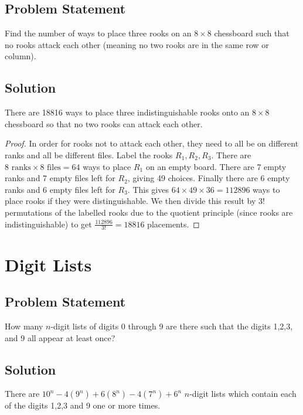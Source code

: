 \documentclass[12pt]{article}
\begin{document}
\subsection*{Problem Statement}
Find the number of ways to place three rooks on an $8\times8$ chessboard such that no rooks attack each other (meaning no two rooks are in the same row or column).
\subsection*{Solution}

There are 18816 ways to place three indistinguishable rooks onto an $8\times8$ chessboard so that no two rooks can attack each other.

\begin{proof}
In order for rooks not to attack each other, they need to all be on different ranks and all be different files. Label the rooks $R_1, R_2, R_3$. There are $8 \text{ ranks} \times 8 \text{ files} = 64$ ways to place $R_1$ on an empty board. There are 7 empty ranks and 7 empty files left for $R_2$, giving 49 choices. Finally there are 6 empty ranks and 6 empty files left for $R_3$. This gives $64\times49\times36=112896$ ways to place rooks if they were distinguishable. We then divide this result by $3!$ permutations of the labelled rooks due to the quotient principle (since rooks are indistinguishable) to get $\frac{112896}{3!} = 18816$ placements.
\end{proof}

\section{Digit Lists}

\subsection*{Problem Statement}
How many $n$-digit lists of digits 0 through 9 are there such that the digits 1,2,3, and 9 all appear at least once?
\subsection*{Solution}

\newcommand{\dlist}[1]{D_{#1}}
There are $10^n - 4(9^n) + 6(8^n) - 4(7^n) + 6^n$ $n$-digit lists which contain each of the digits 1,2,3 and 9 one or more times.
\end{document}
